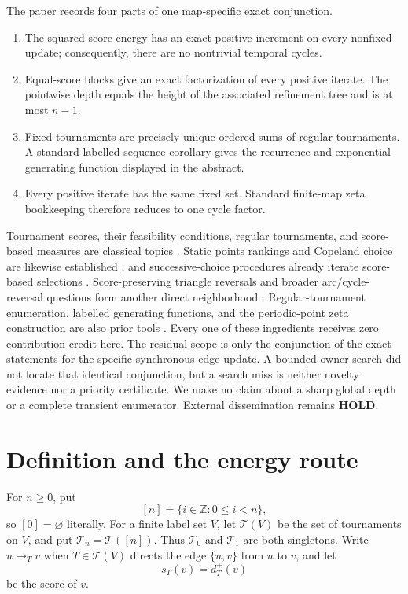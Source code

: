 \documentclass[11pt,a4paper]{amsart}
\theoremstyle{definition}
\theoremstyle{remark}
\newcommand{\Tourn}{\mathcal T}
\begin{document}
The paper records four parts of one map-specific exact conjunction.
\begin{enumerate}
\item The squared-score energy has an exact positive increment on every
  nonfixed update; consequently, there are no nontrivial temporal cycles.
\item Equal-score blocks give an exact factorization of every positive
  iterate.  The pointwise depth equals the height of the associated
  refinement tree and is at most $n-1$.
\item Fixed tournaments are precisely unique ordered sums of regular
  tournaments.  A standard labelled-sequence corollary gives the recurrence
  and exponential generating function displayed in the abstract.
\item Every positive iterate has the same fixed set.  Standard finite-map
  zeta bookkeeping therefore reduces to one cycle factor.
\end{enumerate}

Tournament scores, their feasibility conditions, regular tournaments, and
score-based measures are classical topics
\cite{Landau1953,Moon1968,Monsuur2005}.  Static points rankings and Copeland
choice are likewise established \cite{Rubinstein1980,Henriet1985}, and
successive-choice procedures already iterate score-based selections
\cite{Bouyssou2004,LinaresBodanza2025}.  Score-preserving triangle reversals
and broader arc/cycle-reversal questions form another direct neighborhood
\cite{Ryser1964,Thomassen1988,GhoshEtAl2026}.  Regular-tournament enumeration,
labelled generating functions, and the periodic-point zeta construction are
also prior tools \cite{McKay1990,FlajoletSedgewick2009,ArtinMazur1965}.
Every one of these ingredients receives zero contribution credit here.  The
residual scope is only the conjunction of the exact statements for the
specific synchronous edge update.  A bounded owner search did not locate
that identical conjunction, but a search miss is neither novelty evidence
nor a priority certificate.  We make no claim about a sharp global depth or
a complete transient enumerator.  External dissemination remains
\textbf{HOLD}.

\section{Definition and the energy route}\label{sec:energy}

For $n\geq0$, put
\[
             [n]=\{i\in\mathbb Z:0\leq i<n\},
\]
so $[0]=\varnothing$ literally.  For a finite label set $V$, let
$\Tourn(V)$ be the set of tournaments on $V$, and put
$\Tourn_n=\Tourn([n])$.  Thus $\Tourn_0$ and $\Tourn_1$ are both singletons.
Write $u\to_Tv$ when $T\in\Tourn(V)$ directs the edge $\{u,v\}$ from $u$ to
$v$, and let
\[
 s_T(v)=d_T^+(v)
\]
be the score of $v$.
\end{document}
